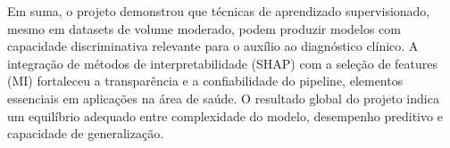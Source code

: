 \documentclass[12pt]{article}
\begin{document}
Em suma, o projeto demonstrou que técnicas de aprendizado supervisionado, mesmo em datasets de volume moderado, podem produzir modelos com capacidade discriminativa relevante para o auxílio ao diagnóstico clínico. A integração de métodos de interpretabilidade (SHAP) com a seleção de features (MI) fortaleceu a transparência e a confiabilidade do pipeline, elementos essenciais em aplicações na área de saúde. O resultado global do projeto indica um equilíbrio adequado entre complexidade do modelo, desempenho preditivo e capacidade de generalização.
\end{document}
